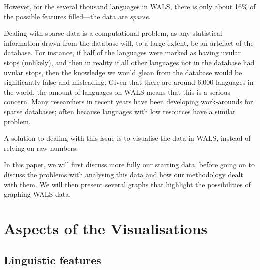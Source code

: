 \documentclass[11pt]{article}
\begin{document}
However, for the several thousand languages in WALS, there is only about 16\% of the possible features filled---the data are \emph{sparse}.

Dealing with sparse data is a computational problem, as any statistical information drawn from the database will, to a large extent, be an artefact of the database. For instance, if half of the languages were marked as having uvular stops (unlikely), and then in reality if all other languages not in the database had uvular stops, then the knowledge we would glean from the database would be significantly false and misleading. Given that there are around 6,000 languages in the world, the amount of languages on WALS means that this is a serious concern. Many researchers in recent years have been developing work-arounds for sparse databases; often because languages with low resources have a similar problem. %


A solution to dealing with this issue is to visualise the data in WALS, instead of relying on raw numbers.



In this paper, we will first discuss more fully our starting data, before going on to discuss the problems with analysing this data and how our methodology dealt with them. We will then present several graphs that highlight the possibilities of graphing WALS data. 

\section{Aspects of the Visualisations}

\subsection{Linguistic features}
\end{document}
